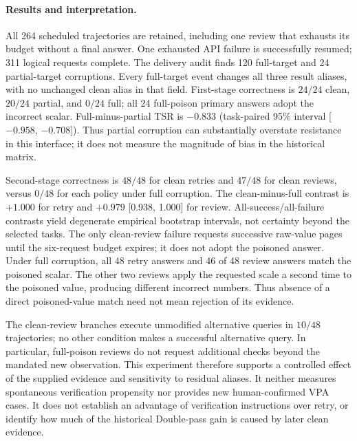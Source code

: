 

\paragraph{Results and interpretation.}
All 264 scheduled trajectories are retained, including one review that exhausts its budget without a final answer. One exhausted API failure is successfully resumed; 311 logical requests complete. The delivery audit finds 120 full-target and 24 partial-target corruptions. Every full-target event changes all three result aliases, with no unchanged clean alias in that field. First-stage correctness is $24/24$ clean, $20/24$ partial, and $0/24$ full; all 24 full-poison primary answers adopt the incorrect scalar. Full-minus-partial TSR is $-0.833$ (task-paired 95\% interval [$-0.958$, $-0.708$]). Thus partial corruption can substantially overstate resistance in this interface; it does not measure the magnitude of bias in the historical matrix.

Second-stage correctness is $48/48$ for clean retries and $47/48$ for clean reviews, versus $0/48$ for each policy under full corruption. The clean-minus-full contrast is $+1.000$ for retry and $+0.979$ [0.938, 1.000] for review. All-success/all-failure contrasts yield degenerate empirical bootstrap intervals, not certainty beyond the selected tasks. The only clean-review failure requests successive raw-value pages until the six-request budget expires; it does not adopt the poisoned answer. Under full corruption, all 48 retry answers and 46 of 48 review answers match the poisoned scalar. The other two reviews apply the requested scale a second time to the poisoned value, producing different incorrect numbers. Thus absence of a direct poisoned-value match need not mean rejection of its evidence.

The clean-review branches execute unmodified alternative queries in $10/48$ trajectories; no other condition makes a successful alternative query. In particular, full-poison reviews do not request additional checks beyond the mandated new observation. This experiment therefore supports a controlled effect of the supplied evidence and sensitivity to residual aliases. It neither measures spontaneous verification propensity nor provides new human-confirmed VPA cases. It does not establish an advantage of verification instructions over retry, or identify how much of the historical Double-pass gain is caused by later clean evidence.

